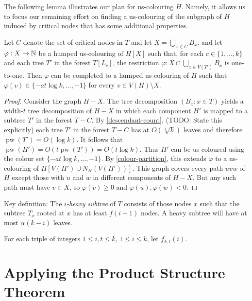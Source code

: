 \documentclass[kpfonts]{patmorin}
\DeclareMathOperator{\pw}{pw}
\begin{document}
The following lemma illustrates our plan for us-colouring $H$.  Namely, it allows us to focus our remaining effort on finding a us-colouring of the subgraph of $H$ induced by critical nodes that has some additional properties.

\begin{lem}
    Let $C$ denote the set of critical nodes in $T$ and let $X=\bigcup_{x\in C} B_x$. and let $\varphi: X\to\mathbb{N}$ be a humped us-colouring of $H[X]$ such that, for each $c\in\{1,\ldots,k\}$ and each tree $T'$ in the forest $T[L_c]$, the restriction $\varphi: X\cap \bigcup_{x\in V(T')}B_x$ is one-to-one.  Then $\varphi$ can be completed to a humped us-colouring of $H$ such that $\varphi(v)\in\{-at\log k,\ldots,-1\}$ for every $v\in V(H)\setminus X$.
\end{lem}

\begin{proof}
    Consider the graph $H-X$.  The tree decomposition $(B_x:x\in T)$ yields a width-$t$ tree decomposition of $H-X$ in which each component $H'$ is mapped to a subtree $T'$ in the forest $T-C$.  By \cref{descendant-count}, (TODO: State this explicitly) each tree $T'$ in the forest $T-C$ has at $O(\sqrt[4]{k})$ leaves and therefore $\pw(T')=O(\log k)$.  It follows that $\pw(H')=O(t\pw(T'))=O(t\log k)$.  Thus $H'$ can be us-coloured using the colour set $\{-at\log k,\ldots,-1\}$.  By \cref{colour-partition}, this extends $\varphi$ to a us-colouring of $H[V(H')\cup N_H(V(H'))]$.  This graph covers every path $uvw$ of $H$ except those with $u$ and $w$ in different components of $H-X$.  But any such path must have $v\in X$, so $\varphi(v)\ge 0$ and $\varphi(u),\varphi(w)<0$.
\end{proof}
















Key definition:  The \emph{$i$-heavy subtree} of $T$ consists of those nodes $x$ such that the subtree $T_x$ rooted at $x$ has at least $f(i-1)$ nodes.  A heavy subtree will have at most $\alpha(k-i)$ leaves.


For each triple of integers $1\le i,t \le k$, $1\le i\le k$, let $f_{k,t}(i)$.



\section{Applying the Product Structure Theorem}
\end{document}
